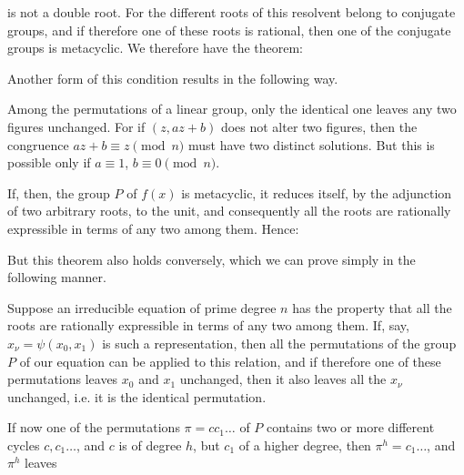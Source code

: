 is not a double root. For the different roots of this resolvent belong to conjugate groups, and if therefore one of these roots is rational, then one of the conjugate groups is metacyclic. We therefore have the theorem:


Another form of this condition results in the following way.

Among the permutations of a linear group, only the identical one leaves any two figures unchanged. For if $(z, az+b)$ does not alter two figures, then the congruence $az+b \equiv z \pmod n$ must have two distinct solutions. But this is possible only if $a \equiv 1$, $b \equiv 0 \pmod n$.

If, then, the group $P$ of $f(x)$ is metacyclic, it reduces itself, by the adjunction of two arbitrary roots, to the unit, and consequently all the roots are rationally expressible in terms of any two among them. Hence:


But this theorem also holds conversely, which we can prove simply in the following manner.

Suppose an irreducible equation of prime degree $n$ has the property that all the roots are rationally expressible in terms of any two among them. If, say, $x_\nu = \psi(x_0, x_1)$ is such a representation, then all the permutations of the group $P$ of our equation can be applied to this relation, and if therefore one of these permutations leaves $x_0$ and $x_1$ unchanged, then it also leaves all the $x_\nu$ unchanged, i.e. it is the identical permutation. 

If now one of the permutations $\pi = cc_1 \ldots$ of $P$ contains two or more different cycles $c, c_1 \ldots$, and $c$ is of degree $h$, but $c_1$ of a higher degree, then $\pi^h = c_1 \ldots$, and $\pi^h$ leaves
